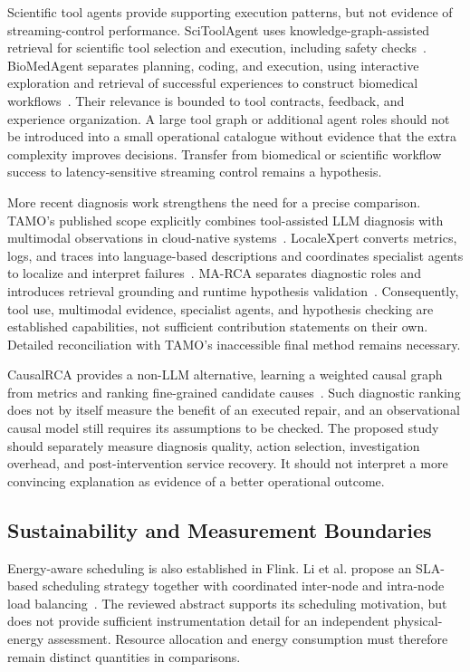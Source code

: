Scientific tool agents provide supporting execution patterns, but not evidence of streaming-control performance. SciToolAgent uses knowledge-graph-assisted retrieval for scientific tool selection and execution, including safety checks~\cite{ding2025scitoolagent}. BioMedAgent separates planning, coding, and execution, using interactive exploration and retrieval of successful experiences to construct biomedical workflows~\cite{bu2026biomedagent}. Their relevance is bounded to tool contracts, feedback, and experience organization. A large tool graph or additional agent roles should not be introduced into a small operational catalogue without evidence that the extra complexity improves decisions. Transfer from biomedical or scientific workflow success to latency-sensitive streaming control remains a hypothesis.

More recent diagnosis work strengthens the need for a precise comparison. TAMO's published scope explicitly combines tool-assisted LLM diagnosis with multimodal observations in cloud-native systems~\cite{zhang2025tamo}. LocaleXpert converts metrics, logs, and traces into language-based descriptions and coordinates specialist agents to localize and interpret failures~\cite{zhong2026localexpert}. MA-RCA separates diagnostic roles and introduces retrieval grounding and runtime hypothesis validation~\cite{fu2026marca}. Consequently, tool use, multimodal evidence, specialist agents, and hypothesis checking are established capabilities, not sufficient contribution statements on their own. Detailed reconciliation with TAMO's inaccessible final method remains necessary.

CausalRCA provides a non-LLM alternative, learning a weighted causal graph from metrics and ranking fine-grained candidate causes~\cite{xin2023causalrca}. Such diagnostic ranking does not by itself measure the benefit of an executed repair, and an observational causal model still requires its assumptions to be checked. The proposed study should separately measure diagnosis quality, action selection, investigation overhead, and post-intervention service recovery. It should not interpret a more convincing explanation as evidence of a better operational outcome.

\subsection{Sustainability and Measurement Boundaries}
Energy-aware scheduling is also established in Flink. Li et al. propose an SLA-based scheduling strategy together with coordinated inter-node and intra-node load balancing~\cite{li2025energyflink}. The reviewed abstract supports its scheduling motivation, but does not provide sufficient instrumentation detail for an independent physical-energy assessment. Resource allocation and energy consumption must therefore remain distinct quantities in comparisons.

